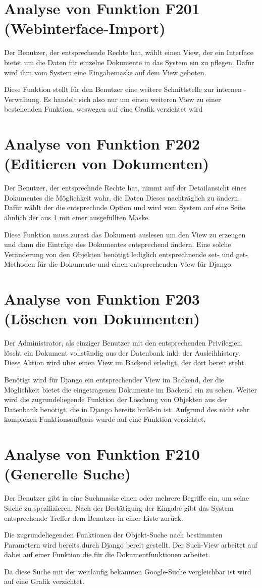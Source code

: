 \section{Analyse von Funktion F201 (Webinterface-Import)}
\label{f:201}
Der Benutzer, der entsprechende Rechte hat, wählt einen View, der ein Interface
bietet um die Daten für einzelne Dokumente in das System ein zu pflegen. Dafür
wird ihm vom System eine Eingabemaske auf dem View geboten.

Diese Funktion stellt für den Benutzer eine weitere Schnittstelle zur internen
\BibTeX -Verwaltung. Es handelt sich also nur um einen weiteren View zu einer
bestehenden Funktion, weswegen auf eine Grafik verzichtet wird


\section{Analyse von Funktion F202 (Editieren von Dokumenten)}
Der Benutzer, der entsprechnde Rechte hat, nimmt auf der Detailansicht eines
Dokumentes die Möglichkeit wahr, die Daten Dieses nachträglich zu ändern. Dafür
wählt der die entsprechnde Option und wird vom System auf eine Seite ähnlich der
aus \ref{f:201} mit einer ausgefüllten Maske.

Diese Funktion muss zurest das Dokument auslesen um den View zu erzeugen und
dann die Einträge des Dokumentes entsprechend ändern. Eine solche Veränderung
von den Objekten benötigt lediglich entsprechnende set- und get-Methoden für die
Dokumente und einen entsprechenden View für Django.

\section{Analyse von Funktion F203 (Löschen von Dokumenten)}
Der Administrator, als einziger Benutzer mit den entsprechenden Privilegien,
löscht ein Dokument vollständig aus der Datenbank inkl. der Ausleihhistory.
Diese Aktion wird über einen View im Backend erledigt, der dort bereit steht.

Benötigt wird für Django ein entsprechender View im Backend, der die Möglichkeit
bietet die eingetragenen Dokumente im Backend ein zu sehen. Weiter wird die
zugrundeliegende Funktion der Löschung von Objekten aus der Datenbank benötigt,
die in Django bereits build-in ist. Aufgrund des nicht sehr komplexen
Funktionsaufbaus wurde auf eine Funktion verzichtet.

\section{Analyse von Funktion F210 (Generelle Suche)}
Der Benutzer gibt in eine Suchmaske einen oder mehrere Begriffe ein, um seine
Suche zu spezifizieren. Nach der Bestätigung der Eingabe gibt das System
entsprechende Treffer dem Benutzer in einer Liste zurück.

Die zugrundeliegenden Funktionen der Objekt-Suche nach bestimmten Parametern
wird bereits durch Django bereit gestellt. Der Such-View arbeitet auf dabei auf
einer Funktion die für die Dokumentfunktionen arbeitet.

Da diese Suche mit der weitläufig bekannten Google-Suche vergleichbar ist wird
auf eine Grafik verzichtet.
